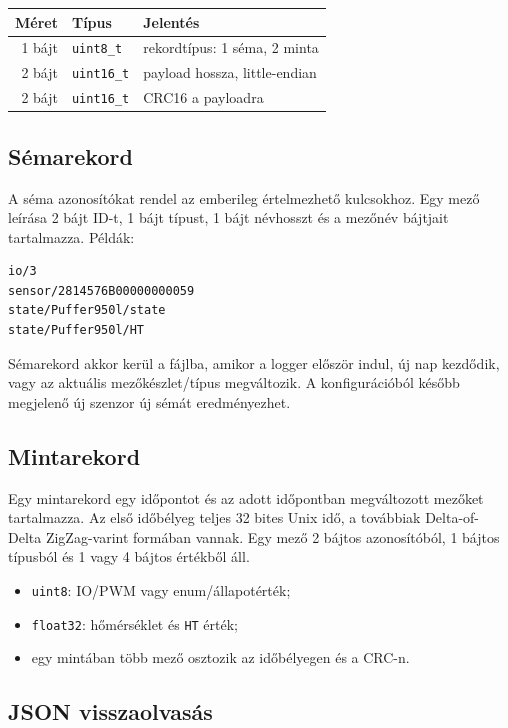 \documentclass[11pt,a4paper]{article}
\begin{document}
\begin{longtable}{rll}
\toprule
Méret & Típus & Jelentés \\
\midrule
1 bájt & \texttt{uint8\_t} & rekordtípus: 1 séma, 2 minta \\
2 bájt & \texttt{uint16\_t} & payload hossza, little-endian \\
2 bájt & \texttt{uint16\_t} & CRC16 a payloadra \\
\bottomrule
\end{longtable}

\subsection{Sémarekord}

A séma azonosítókat rendel az emberileg értelmezhető kulcsokhoz. Egy mező leírása 2 bájt ID-t, 1 bájt típust, 1 bájt névhosszt és a mezőnév bájtjait tartalmazza. Példák:

\begin{lstlisting}
io/3
sensor/2814576B00000000059
state/Puffer950l/state
state/Puffer950l/HT
\end{lstlisting}

Sémarekord akkor kerül a fájlba, amikor a logger először indul, új nap kezdődik, vagy az aktuális mezőkészlet/típus megváltozik. A konfigurációból később megjelenő új szenzor új sémát eredményezhet.

\subsection{Mintarekord}

Egy mintarekord egy időpontot és az adott időpontban megváltozott mezőket tartalmazza. Az első időbélyeg teljes 32 bites Unix idő, a továbbiak Delta-of-Delta ZigZag-varint formában vannak. Egy mező 2 bájtos azonosítóból, 1 bájtos típusból és 1 vagy 4 bájtos értékből áll.

\begin{itemize}
  \item \texttt{uint8}: IO/PWM vagy enum/állapotérték;
  \item \texttt{float32}: hőmérséklet és \texttt{HT} érték;
  \item egy mintában több mező osztozik az időbélyegen és a CRC-n.
\end{itemize}

\subsection{JSON visszaolvasás}
\end{document}

